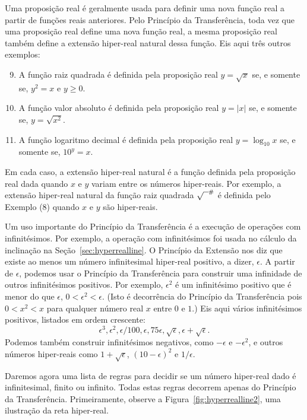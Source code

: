 Uma proposição real é geralmente usada para definir uma nova função real
a partir de funções reais anteriores. Pelo Princípio da Transferência,
toda vez que uma proposição real define uma nova função real, a mesma
proposição real também define a extensão hiper-real natural dessa função.
Eis aqui três outros exemplos:
\begin{enumerate}[(1)]
\setcounter{enumi}{8}
\item A função raiz quadrada é definida pela proposição real $y = \sqrt{x}$
      se, e somente se, $y^2 = x$ e $y \ge 0$.
\item A função valor absoluto é definida pela proposição real $y = |x|$
      se, e somente se, $y = \sqrt{x^2}$.
\item A função logaritmo decimal é definida pela proposição real
      $y = \log_{10} x$ se, e somente se, $10^y = x$.
\end{enumerate}
Em cada caso, a extensão hiper-real natural é a função definida pela
proposição real dada quando $x$ e $y$ variam entre os números
hiper-reais. Por exemplo, a extensão hiper-real natural da função
raiz quadrada ${\sqrt{\phantom{x}}}^\#$ é definida pelo Exemplo (8) quando
$x$ e $y$ são hiper-reais.

Um uso importante do Princípio da Transferência é a execução de operações
com infinitésimos. Por exemplo, a operação com infinitésimos foi usada
no cálculo da inclinação na Seção~\ref{sec:hyperrealline}. O Princípio da
Extensão nos diz que existe ao menos um número infinitesimal hiper-real
positivo, a dizer, $\epsilon$. A partir de $\epsilon$, podemos usar o
Princípio da Transferência para construir uma infinidade de outros
infinitésimos positivos. Por exemplo, $\epsilon^2$ é um infinitésimo
positivo que é menor do que $\epsilon$, $0 < \epsilon^2 < \epsilon$.
(Isto é decorrência do Princípio da Transferência pois $0 < x^2 < x$
para qualquer número real $x$ entre $0$ e $1$.) Eis aqui vários infinitésimos
positivos, listados em ordem crescente:
$$
  \epsilon^3, \epsilon^2, \epsilon/100, \epsilon, 75\epsilon,
  \sqrt{\epsilon}, \epsilon + \sqrt{\epsilon}.
$$
Podemos também construir infinitésimos negativos, como $-\epsilon$ e
$-\epsilon^2$, e outros números hiper-reais como $1 + \sqrt{\epsilon}$,
$(10 - \epsilon)^2$ e $1/\epsilon$.

Daremos agora uma lista de regras para decidir se um número hiper-real
dado é infinitesimal, finito ou infinito. Todas estas regras decorrem
apenas do Princípio da Transferência. Primeiramente, observe a
Figura~\ref{fig:hyperrealline2}, uma ilustração da reta hiper-real.

